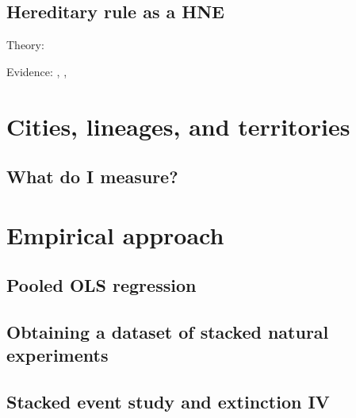 \documentclass{article}
\begin{document}

\subsection{Hereditary rule as a HNE}

Theory: \cite{besley2017}

Evidence: \cite{olken2005}, \cite{dube2020}, \cite{ottinger2022}


\section{Cities, lineages, and territories}


\subsection{What do I measure?}


\section{Empirical approach}


\subsection{Pooled OLS regression}


\subsection{Obtaining a dataset of stacked natural experiments}


\subsection{Stacked event study and extinction IV}

\end{document}

